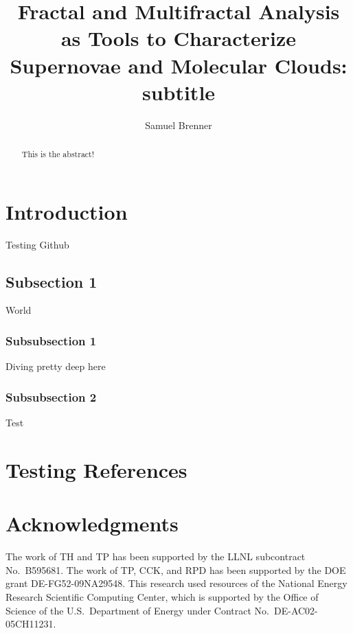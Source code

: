 \documentclass[iop]{emulateapj}
\begin{document}
%
\title{Fractal and Multifractal Analysis as Tools to Characterize Supernovae and Molecular Clouds: \\
subtitle}
%
\author{Samuel Brenner}
%
%
%
%
%
%
\begin{abstract}
This is the abstract!
\end{abstract}
%
%
%
%
%
%

\section{Introduction}
Testing Github
\subsection{Subsection 1}
World
\subsubsection{Subsubsection 1}
Diving pretty deep here
\subsubsection{Subsubsection 2}
Test

\section{Testing References}

\cite{kifonidis+03}

\citep{kifonidis+06}

\citet{kifonidis+06}

\cite{kifonidis+03,kifonidis+06}

\citep{kifonidis+03,kifonidis+06}

\citet{kifonidis+03,kifonidis+06}

%
%
%
\section{Acknowledgments}\label{s:ack}
%
%
%
The work of TH and TP has been supported by the LLNL subcontract
No.\ B595681. The work of TP, CCK, and RPD has been supported by the
DOE grant DE-FG52-09NA29548. This research used resources of the
National Energy Research Scientific Computing Center, which is
supported by the Office of Science of the U.S.\ Department of Energy
under Contract No.\ DE-AC02-05CH11231.
%
%
%


%
%
%
\end{document}
